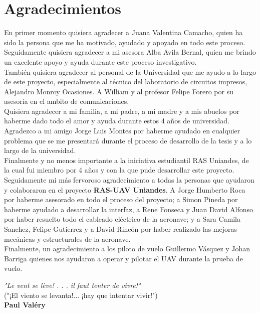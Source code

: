   \section{Agradecimientos}

En primer momento quisiera agradecer a Juana Valentina Camacho, quien ha sido la persona que me ha motivado, ayudado y apoyado en todo este proceso. Seguidamente quisiera agradecer a mi asesora Alba Avila Bernal, quien me brindo un excelente apoyo y ayuda durante este proceso investigativo. \\

También quisiera agradecer al personal de la Universidad que me ayudo a lo largo de este proyecto, especialmente al técnico del laboratorio de circuitos impresos, Alejandro Monroy Ocasiones. A William y al profesor Felipe Forero por su asesoría en el ambito de comunicaciones.\\

Quisiera agradecer a mi familia, a mi padre, a mi madre y a mis abuelos por haberme dado todo el amor y ayuda durante estos 4 años de universidad. Agradezco a mi amigo Jorge Luis Montes  por haberme ayudado en cualquier problema que se me presentará durante el proceso de desarrollo de la tesis y a lo largo de la universidad. \\

Finalmente y no menos importante a la iniciativa estudiantil RAS Uniandes, de la cual fui miembro por 4 años y con la que pude desarrollar este proyecto. Seguidamente mi más fervoroso agradecimiento a todas la personas que ayudaron y colaboraron en el proyecto \textbf{RAS-UAV Uniandes}. A Jorge Humberto Roca por haberme asesorado en todo el proceso del proyecto; a Simon Pineda por haberme ayudado a desarrollar la interfaz, a Rene Fonseca y Juan David Alfonso por haber resuelto todo el cableado eléctrico de la aeronave; y a Sara Camila Sanchez, Felipe Gutierrez y a David Rincón por haber realizado las mejoras mecánicas y estructurales de la aeronave. \\

Finalmente, un agradecimiento a los piloto de vuelo Guillermo Vásquez y Johan Barriga quienes nos ayudaron a operar y pilotar el UAV durante la prueba de vuelo.



\begin{flushright}
\textit{"Le vent se lève! . . . il faut tenter de vivre!"}\\
("¡El viento se levanta!... ¡hay que intentar vivir!")\\
\textbf{Paul Valéry}
\end{flushright}